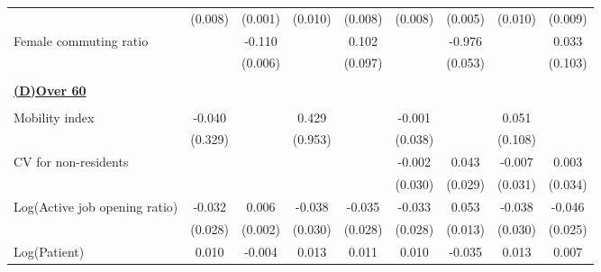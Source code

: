 \begin{tabular}{l*{8}{c}}
                    &     (0.008)         &     (0.001)         &     (0.010)         &     (0.008)         &     (0.008)         &     (0.005)         &     (0.010)         &     (0.009)         \\
\addlinespace
Female commuting ratio&                     &      -0.110\sym{***}&                     &       0.102         &                     &      -0.976\sym{***}&                     &       0.033         \\
                    &                     &     (0.006)         &                     &     (0.097)         &                     &     (0.053)         &                     &     (0.103)         \\
\hline \\ \multicolumn{9}{l}{\textbf{\underline{(D)Over 60}}} \\\\[-1ex]
Mobility index      &      -0.040         &                     &       0.429         &                     &      -0.001         &                     &       0.051         &                     \\
                    &     (0.329)         &                     &     (0.953)         &                     &     (0.038)         &                     &     (0.108)         &                     \\
\addlinespace
CV for non-residents&                     &                     &                     &                     &      -0.002         &       0.043         &      -0.007         &       0.003         \\
                    &                     &                     &                     &                     &     (0.030)         &     (0.029)         &     (0.031)         &     (0.034)         \\
\addlinespace
Log(Active job opening ratio)&      -0.032         &       0.006\sym{***}&      -0.038         &      -0.035         &      -0.033         &       0.053\sym{***}&      -0.038         &      -0.046\sym{*}  \\
                    &     (0.028)         &     (0.002)         &     (0.030)         &     (0.028)         &     (0.028)         &     (0.013)         &     (0.030)         &     (0.025)         \\
\addlinespace
Log(Patient)        &       0.010         &      -0.004\sym{***}&       0.013         &       0.011         &       0.010         &      -0.035\sym{***}&       0.013         &       0.007         \\

\end{tabular}
